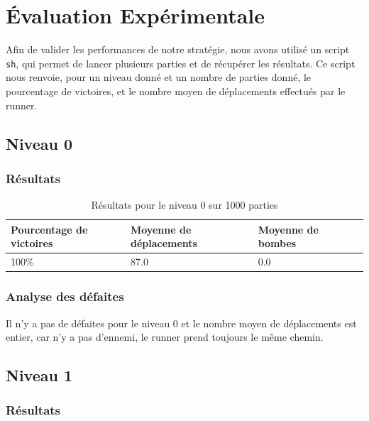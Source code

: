 \chapter{Évaluation Expérimentale}
\label{cp:evaluation}

Afin de valider les performances de notre stratégie, nous avons utilisé un script \texttt{sh}, qui permet de lancer plusieurs parties et de récupérer les résultats.
Ce script nous renvoie, pour un niveau donné et un nombre de parties donné, le pourcentage de victoires, et le nombre moyen de déplacements effectués par le runner.

\section{Niveau 0}

\subsection{Résultats}

\begin{table}[!htpb]
    \begin{tabularx}{\textwidth}{lXXX}
        \toprule
        Pourcentage de victoires & Moyenne de déplacements & Moyenne de bombes \\
        \midrule
        100\% & 87.0 & 0.0 \\
        \bottomrule
    \end{tabularx}
    \caption{Résultats pour le niveau 0 sur 1000 parties}
    \label{tab:res-niveau-0}
\end{table}

\subsection{Analyse des défaites}

Il n'y a pas de défaites pour le niveau 0 et le nombre moyen de déplacements est entier, car n'y a pas d'ennemi, le runner prend toujours le même chemin.

\newpage

\section{Niveau 1}

\subsection{Résultats}

